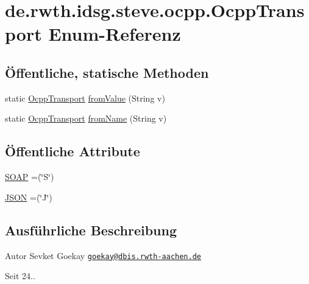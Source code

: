 \hypertarget{enumde_1_1rwth_1_1idsg_1_1steve_1_1ocpp_1_1_ocpp_transport}{\section{de.\-rwth.\-idsg.\-steve.\-ocpp.\-Ocpp\-Transport Enum-\/\-Referenz}
\label{enumde_1_1rwth_1_1idsg_1_1steve_1_1ocpp_1_1_ocpp_transport}
}
\subsection*{Öffentliche, statische Methoden}
\begin{DoxyCompactItemize}
\item 
static \hyperlink{enumde_1_1rwth_1_1idsg_1_1steve_1_1ocpp_1_1_ocpp_transport}{Ocpp\-Transport} \hyperlink{enumde_1_1rwth_1_1idsg_1_1steve_1_1ocpp_1_1_ocpp_transport_a64ec586d12d40966424ce811f697b852}{from\-Value} (String v)
\item 
static \hyperlink{enumde_1_1rwth_1_1idsg_1_1steve_1_1ocpp_1_1_ocpp_transport}{Ocpp\-Transport} \hyperlink{enumde_1_1rwth_1_1idsg_1_1steve_1_1ocpp_1_1_ocpp_transport_a0c738a026b87016fca5b8254b6d1f1c9}{from\-Name} (String v)
\end{DoxyCompactItemize}
\subsection*{Öffentliche Attribute}
\begin{DoxyCompactItemize}
\item 
\hyperlink{enumde_1_1rwth_1_1idsg_1_1steve_1_1ocpp_1_1_ocpp_transport_ae1fa7bdd519c49e7c5d175538ec2eb47}{S\-O\-A\-P} =(\char`\"{}S\char`\"{})
\item 
\hyperlink{enumde_1_1rwth_1_1idsg_1_1steve_1_1ocpp_1_1_ocpp_transport_aa9ac4184d327d7868285a13790f45cdc}{J\-S\-O\-N} =(\char`\"{}J\char`\"{})
\end{DoxyCompactItemize}


\subsection{Ausführliche Beschreibung}
\begin{DoxyAuthor}{Autor}
Sevket Goekay \href{mailto:goekay@dbis.rwth-aachen.de}{\tt goekay@dbis.\-rwth-\/aachen.\-de} 
\end{DoxyAuthor}
\begin{DoxySince}{Seit}
24.. 
\end{DoxySince}


